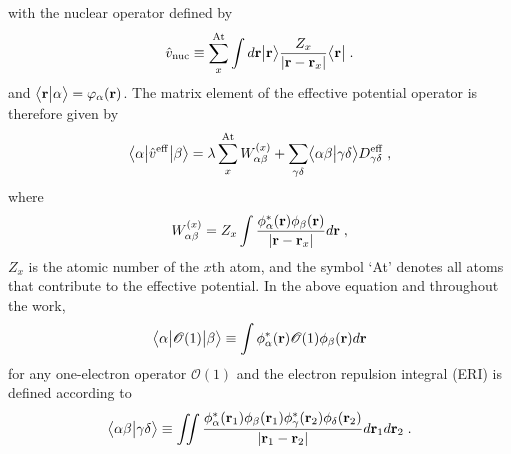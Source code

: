 %
with the nuclear
operator
defined by
%
\begin{equation}
        \hat{v}_{\rm nuc} \equiv \sum_x^{\rm At}  
                     \int d{\bf r} \Ket{{\bf r}} 
                     \frac{Z_x}{\vert {\bf r} - {\bf r}_x \vert}
                     \Bra{{\bf r}} \;.
\end{equation}
%
and $\BraKet{\bf r}{\alpha} = \varphi_\alpha({\bf r})$.
The matrix element of the effective potential operator
is therefore given by
%
\begin{equation}
	\tBraKet{\alpha}{ \hat{v}^{\rm eff} }{\beta}
	= \lambda \sum_x^{\rm At} W_{\alpha\beta}^{(x)} +
        \sum_{\gamma\delta} \BraKet{\alpha\beta}{\gamma\delta} D^{\rm eff}_{\gamma\delta}  \;,
\end{equation}
%
where 
%
\begin{equation}
 W_{\alpha\beta}^{(x)} = 
 Z_x \int \frac{\phi^*_\alpha({\bf r}) \phi_\beta({\bf r})}{\vert {\bf r} - {\bf r}_x \vert} d{\bf r} \;,
\end{equation}
%
$Z_x$ is the atomic number of the $x$th atom,
and the symbol `At' denotes all atoms that contribute to the effective potential.
In the above equation and throughout the work, 
%
\begin{equation}
\tBraKet{\alpha}{\mathscr{O}(1)}{\beta} \equiv \int \phi^*_\alpha({\bf r}) \mathscr{O}(1) \phi_\beta({\bf r}) d{\bf r} 
\end{equation}
%
for any one\hyp{}electron operator $\mathscr{O}(1)$ 
and the electron repulsion integral (ERI)
is defined according to
%
\begin{equation}
	\BraKet{\alpha\beta}{\gamma\delta} \equiv
	\iint 
	\frac{ \phi_\alpha^{*}({\bf r}_1) \phi_\beta({\bf r}_1) 
	       \phi_\gamma^{*}({\bf r}_2) \phi_\delta({\bf r}_2) }{ \vert {\bf r}_1 - {\bf r}_2 \vert}
	d{\bf r}_1 d{\bf r}_2  \;.
\end{equation}
%


